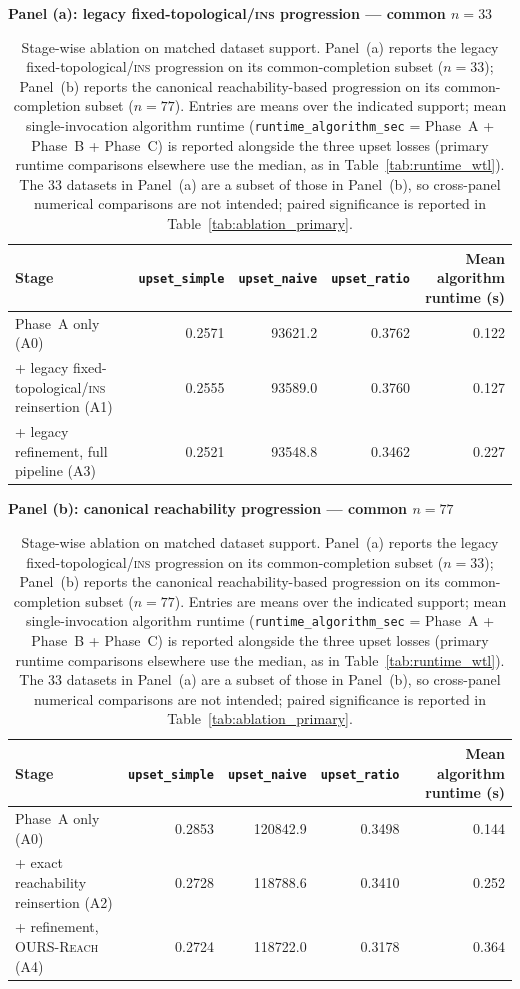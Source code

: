 \documentclass{article}
\begin{document}
\begin{table}[H]
\centering
\footnotesize
\setlength{\tabcolsep}{4pt}
\textbf{Panel (a): legacy fixed-topological/\textsc{ins} progression --- common $n=33$}\\[2pt]
\begin{tabular}{@{}lrrrr@{}}
\toprule
\textbf{Stage} & \texttt{upset\_simple} & \texttt{upset\_naive} & \texttt{upset\_ratio} & Mean algorithm runtime (s) \\
\midrule
Phase~A only (A0) & 0.2571 & 93621.2 & 0.3762 & 0.122 \\
+ legacy fixed-topological/\textsc{ins} reinsertion (A1) & 0.2555 & 93589.0 & 0.3760 & 0.127 \\
+ legacy refinement, full pipeline (A3) & 0.2521 & 93548.8 & 0.3462 & 0.227 \\
\bottomrule
\end{tabular}

\vspace{8pt}
\textbf{Panel (b): canonical reachability progression --- common $n=77$}\\[2pt]
\begin{tabular}{@{}lrrrr@{}}
\toprule
\textbf{Stage} & \texttt{upset\_simple} & \texttt{upset\_naive} & \texttt{upset\_ratio} & Mean algorithm runtime (s) \\
\midrule
Phase~A only (A0) & 0.2853 & 120842.9 & 0.3498 & 0.144 \\
+ exact reachability reinsertion (A2) & 0.2728 & 118788.6 & 0.3410 & 0.252 \\
+ refinement, \textsc{OURS-Reach} (A4) & 0.2724 & 118722.0 & 0.3178 & 0.364 \\
\bottomrule
\end{tabular}
\caption{Stage-wise ablation on matched dataset support. Panel~(a) reports the legacy fixed-topological/\textsc{ins} progression on its common-completion subset ($n=33$); Panel~(b) reports the canonical reachability-based progression on its common-completion subset ($n=77$). Entries are means over the indicated support; mean single-invocation algorithm runtime (\texttt{runtime\_algorithm\_sec} = Phase~A + Phase~B + Phase~C) is reported alongside the three upset losses (primary runtime comparisons elsewhere use the median, as in Table~\ref{tab:runtime_wtl}). The $33$ datasets in Panel~(a) are a subset of those in Panel~(b), so cross-panel numerical comparisons are not intended; paired significance is reported in Table~\ref{tab:ablation_primary}.}
\label{tab:reviewer1_stage_ablation}
\end{table}
\end{document}
